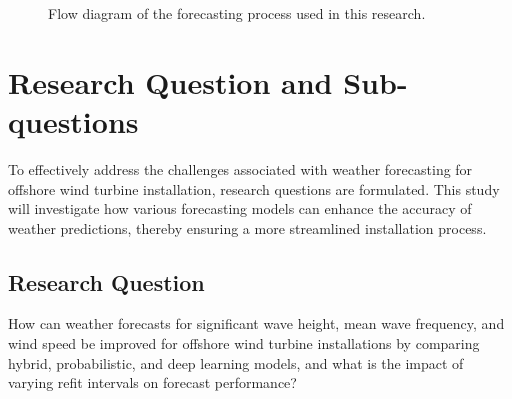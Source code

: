 \begin{figure}[h!]
    \centering
    \caption{Flow diagram of the forecasting process used in this research.}
    \label{fig:forecast_process}
\end{figure}

 
\section{Research Question and Sub-questions}
To effectively address the challenges associated with weather forecasting for offshore wind turbine installation, research questions are formulated. This study will investigate how various forecasting models can enhance the accuracy of weather predictions, thereby ensuring a more streamlined installation process. 

\subsection*{Research Question}  
How can weather forecasts for significant wave height, mean wave frequency, and wind speed be improved for offshore wind turbine installations by comparing hybrid, probabilistic, and deep learning models, and what is the impact of varying refit intervals on forecast performance?


